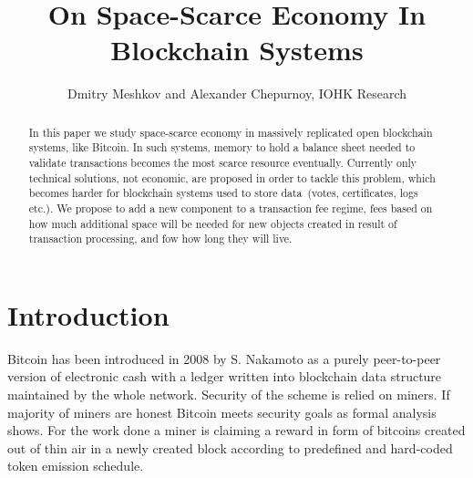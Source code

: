 \documentclass[]{article}   %
\begin{document}
\title{On Space-Scarce Economy In Blockchain Systems}
\author{Dmitry Meshkov and Alexander Chepurnoy, IOHK Research}
\maketitle

\begin{abstract}
In this paper we study space-scarce economy in massively replicated open blockchain systems, like Bitcoin. In such systems, memory to hold a balance sheet needed to validate transactions becomes the most scarce resource eventually. Currently only technical solutions, not economic, are proposed in order to tackle this problem, which becomes harder for blockchain systems used to store data~(votes, certificates, logs etc.). We propose to add a new component to a transaction fee regime, fees based on how much additional space will be needed for new objects created in result of transaction processing, and fow how long they will live.    
\end{abstract}

\section{Introduction}

Bitcoin \cite{Nakamoto2008} has been introduced in 2008 by S. Nakamoto as a purely peer-to-peer version of electronic cash with a ledger written into blockchain data structure maintained by the whole network. Security of the scheme is relied on miners. If majority of miners are honest Bitcoin meets security goals as formal analysis~\cite{Garay2015} shows. For the work done a miner is claiming a reward in form of bitcoins created out of thin air in a newly created block according to predefined and hard-coded token emission schedule. 


\end{document}
